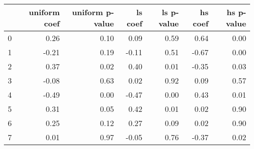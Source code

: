 \begin{tabular}{lrrrrrr}
\toprule
 & uniform coef & uniform p-value & ls coef & ls p-value & hs coef & hs p-value \\
\midrule
0 & 0.26 & 0.10 & 0.09 & 0.59 & 0.64 & 0.00 \\
1 & -0.21 & 0.19 & -0.11 & 0.51 & -0.67 & 0.00 \\
2 & 0.37 & 0.02 & 0.40 & 0.01 & -0.35 & 0.03 \\
3 & -0.08 & 0.63 & 0.02 & 0.92 & 0.09 & 0.57 \\
4 & -0.49 & 0.00 & -0.47 & 0.00 & 0.43 & 0.01 \\
5 & 0.31 & 0.05 & 0.42 & 0.01 & 0.02 & 0.90 \\
6 & 0.25 & 0.12 & 0.27 & 0.09 & 0.02 & 0.90 \\
7 & 0.01 & 0.97 & -0.05 & 0.76 & -0.37 & 0.02 \\
\bottomrule
\end{tabular}
